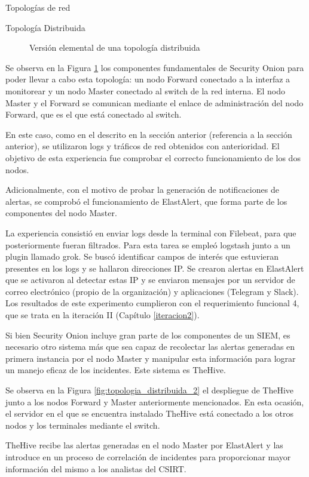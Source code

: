 \begin{section}{Topologías de red }
\begin{subsection} {Topología Distribuida}
\begin{figure}[H]
                \caption{Versión elemental de una topología distribuida}
                \label{fig:topologia_distribuida_1}
            \end{figure}
            \FloatBarrier
            Se observa en la Figura \ref{fig:topologia_distribuida_1} los componentes fundamentales de Security Onion para poder llevar a cabo esta topología: un nodo Forward conectado a la interfaz a monitorear y un nodo Master conectado al switch de la red interna. El nodo Master y el Forward se comunican mediante el enlace de administración del nodo Forward, que es el que está conectado al switch. \par
            En este caso, como en el descrito en la sección anterior (referencia a la sección anterior), se utilizaron logs y tráficos de red obtenidos con anterioridad. El objetivo de esta experiencia fue comprobar el correcto funcionamiento de los dos nodos. \par
            Adicionalmente, con el motivo de probar la generación de notificaciones de alertas, se comprobó el funcionamiento de ElastAlert, que forma parte de los componentes del nodo Master. \par
            La experiencia consistió en enviar logs desde la terminal con Filebeat, para que posteriormente fueran filtrados. Para esta tarea se empleó logstash junto a un plugin llamado grok. Se buscó identificar campos de interés que estuvieran presentes en los logs y se hallaron direcciones IP. Se crearon alertas en ElastAlert que se activaron al detectar estas IP y se enviaron mensajes por un servidor de correo electrónico (propio de la organización) y aplicaciones (Telegram y Slack). Los resultados de este experimento cumplieron con el requerimiento funcional 4, que se trata en la iteración II (Capítulo \ref{iteracion2}).\par
            Si bien Security Onion incluye gran parte de los componentes de un SIEM, es necesario otro sistema más que sea capaz de recolectar las alertas generadas en primera instancia por el nodo Master y manipular esta información para lograr un manejo eficaz de los incidentes. Este sistema es TheHive. \par
            Se observa en la Figura \ref{fig:topologia_distribuida_2} el despliegue de TheHive junto a los nodos Forward y Master anteriormente mencionados. En esta ocasión, el servidor en el que se encuentra instalado TheHive está conectado a los otros nodos y los terminales mediante el switch.\par
            TheHive recibe las alertas generadas en el nodo Master por ElastAlert y las introduce en un proceso de correlación de incidentes para proporcionar mayor información del mismo a los analistas del CSIRT. \par

\end{subsection}
\end{section}
